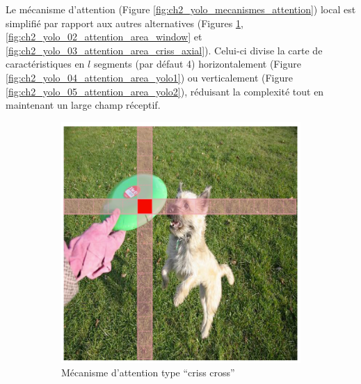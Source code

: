 Le mécanisme d'attention (Figure \ref{fig:ch2_yolo_mecanismes_attention}) local est simplifié par rapport aux autres alternatives (Figures \ref{fig:ch2_yolo_01_attention_area_criss_cross}, \ref{fig:ch2_yolo_02_attention_area_window} et \ref{fig:ch2_yolo_03_attention_area_criss_axial}). Celui-ci divise la carte de caractéristiques en $l$ segments (par défaut 4) horizontalement (Figure \ref{fig:ch2_yolo_04_attention_area_yolo1}) ou verticalement (Figure \ref{fig:ch2_yolo_05_attention_area_yolo2}), réduisant la complexité tout en maintenant un large champ réceptif.

\begin{figure}[H]
    \centering
    \begin{subfigure}[b]{0.30\textwidth}
        \centering
        \includegraphics[width=\textwidth]{02-main/figures/ch2/ch2_yolo_01_attention_area_criss_cross.png}
        \caption{Mécanisme d'attention type ``criss cross''}
        \label{fig:ch2_yolo_01_attention_area_criss_cross}
    \end{subfigure}
    \hfill
    \begin{subfigure}[b]{0.30\textwidth}
        \centering

\end{subfigure}
\end{figure}
